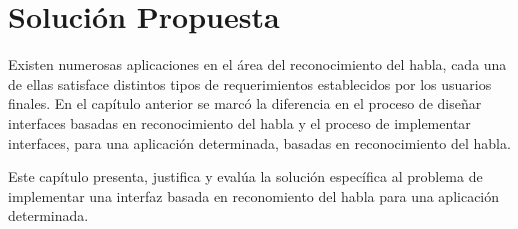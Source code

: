 \chapter{Soluci\'on Propuesta}
\label{sec:solucion}


Existen numerosas aplicaciones en el \'area del reconocimiento del habla, cada una de ellas
satisface distintos tipos de requerimientos establecidos por los usuarios finales. En el
cap\'itulo anterior se marc\'o la diferencia en el proceso de dise\~nar interfaces basadas en reconocimiento
del habla y el proceso de implementar interfaces, para una aplicaci\'on determinada, basadas en reconocimiento del habla.

Este cap\'itulo presenta, justifica y eval\'ua la soluci\'on espec\'ifica al problema de implementar una interfaz
basada en reconomiento del habla para una aplicaci\'on determinada.




